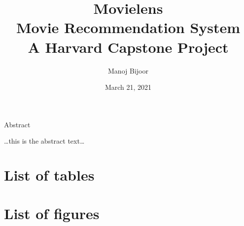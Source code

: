 \documentclass[
]{article}
\title{Movielens\\
Movie Recommendation System\\
A Harvard Capstone Project}
\author{Manoj Bijoor}
\date{March 21, 2021}
\begin{document}
\maketitle



\newpage

\newpage

\begin{center}

\hypertarget{Abstract}{}
\large{Abstract}

\end{center}

\bigskip

\ldots this is the abstract text\ldots{}

\newpage 
\clearpage
{}
\setcounter{secnumdepth}{5}
\setcounter{tocdepth}{5}

\cleardoublepage  \hypertarget{toc}{}
\bookmark[dest=toc,level=chapter]{\contentsname} \tableofcontents

\clearpage

\newpage
\clearpage
{}

\hypertarget{list-of-tables}{%
\section*{List of tables}\label{list-of-tables}}

\renewcommand{\listtablename}{}

\listoftables
\clearpage

\newpage
\clearpage
{}

\hypertarget{list-of-figures}{%
\section*{List of figures}\label{list-of-figures}}

\renewcommand{\listfigurename}{}

\listoffigures
\clearpage

\newpage
\clearpage
{}
\newcommand{\listequationsname}{List of Equations}
\newcommand{\equations}[1]{%
\refstepcounter{equations}
\addcontentsline{equ}{equations}{ \protect\numberline{\theequations}#1}\par}
\end{document}
